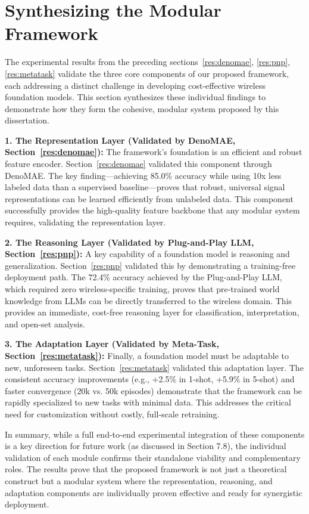 \section{Synthesizing the Modular Framework}
\label{res:synth}
The experimental results from the preceding sections~\ref{res:denomae}, \ref{res:pnp}, \ref{res:metatask} validate the three core components of our proposed framework, each addressing a distinct challenge in developing cost-effective wireless foundation models. This section synthesizes these individual findings to demonstrate how they form the cohesive, modular system proposed by this dissertation.

\textbf{1. The Representation Layer (Validated by DenoMAE, Section~\ref{res:denomae}):}
The framework's foundation is an efficient and robust feature encoder. Section~\ref{res:denomae} validated this component through DenoMAE. The key finding—achieving 85.0\% accuracy while using 10x less labeled data than a supervised baseline—proves that robust, universal signal representations can be learned efficiently from unlabeled data. This component successfully provides the high-quality feature backbone that any modular system requires, validating the representation layer.

\textbf{2. The Reasoning Layer (Validated by Plug-and-Play LLM, Section~\ref{res:pnp}):}
A key capability of a foundation model is reasoning and generalization. Section~\ref{res:pnp} validated this by demonstrating a training-free deployment path. The 72.4\% accuracy achieved by the Plug-and-Play LLM, which required zero wireless-specific training, proves that pre-trained world knowledge from LLMs can be directly transferred to the wireless domain. This provides an immediate, cost-free reasoning layer for classification, interpretation, and open-set analysis.

\textbf{3. The Adaptation Layer (Validated by Meta-Task, Section~\ref{res:metatask}):}
Finally, a foundation model must be adaptable to new, unforeseen tasks. Section~\ref{res:metatask} validated this adaptation layer. The consistent accuracy improvements (e.g., +2.5\% in 1-shot, +5.9\% in 5-shot) and faster convergence (20k vs. 50k episodes) demonstrate that the framework can be rapidly specialized to new tasks with minimal data. This addresses the critical need for customization without costly, full-scale retraining.

In summary, while a full end-to-end experimental integration of these components is a key direction for future work (as discussed in Section 7.8), the individual validation of each module confirms their standalone viability and complementary roles. The results prove that the proposed framework is not just a theoretical construct but a modular system where the representation, reasoning, and adaptation components are individually proven effective and ready for synergistic deployment.


